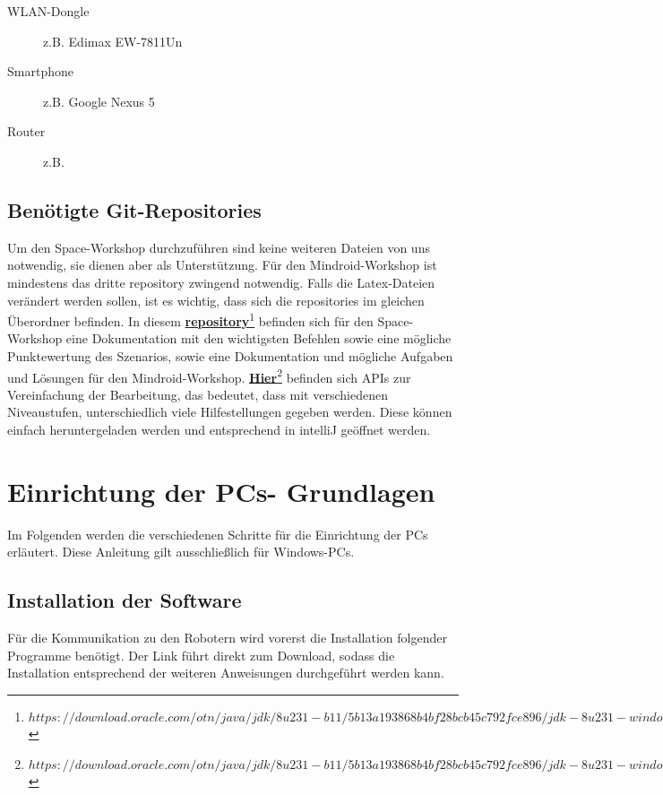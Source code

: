 \documentclass[
	ngerman,
	accentcolor=1c,%
	]{tudapub}
\begin{document}
\begin{description}
	\item[WLAN-Dongle] z.B. Edimax EW-7811Un
	\item[Smartphone] z.B. Google Nexus 5
	\item[Router] z.B. 
\end{description}

\subsection{Ben\"otigte Git-Repositories}
Um den Space-Workshop durchzuf\"uhren sind keine weiteren Dateien von uns notwendig, sie dienen aber als Unterst\"utzung. F\"ur den Mindroid-Workshop ist mindestens das dritte repository zwingend notwendig. Falls die Latex-Dateien ver\"andert werden sollen, ist es wichtig, dass sich die repositories im gleichen \"Uberordner befinden.\newline
In diesem
\href{https://download.oracle.com/otn/java/jdk/8u231-b11/5b13a193868b4bf28bcb45c792fce896/jdk-8u231-windows-x64.exe}{\textbf{repository}\footnote{$https://download.oracle.com/otn/java/jdk/8u231-b11/5b13a193868b4bf28bcb45c792fce896/jdk-8u231-windows-x64.exe$}}
befinden sich für den Space-Workshop eine Dokumentation mit den wichtigsten Befehlen sowie eine m\"ogliche Punktewertung des Szenarios, sowie eine Dokumentation und m\"ogliche Aufgaben und L\"osungen f\"ur den Mindroid-Workshop.
\href{https://download.oracle.com/otn/java/jdk/8u231-b11/5b13a193868b4bf28bcb45c792fce896/jdk-8u231-windows-x64.exe}{\textbf{Hier}\footnote{$https://download.oracle.com/otn/java/jdk/8u231-b11/5b13a193868b4bf28bcb45c792fce896/jdk-8u231-windows-x64.exe$}}
befinden sich APIs zur Vereinfachung der Bearbeitung, das bedeutet, dass mit verschiedenen Niveaustufen, unterschiedlich viele Hilfestellungen gegeben werden. Diese k\"onnen einfach heruntergeladen werden und entsprechend in intelliJ ge\"offnet werden.


\section{Einrichtung der PCs- Grundlagen}
Im Folgenden werden die verschiedenen Schritte für die Einrichtung der PCs erl\"autert. Diese Anleitung gilt ausschlie\ss{}lich f\"ur Windows-PCs.

\subsection{Installation der Software}
F\"ur die Kommunikation zu den Robotern wird vorerst die Installation folgender Programme ben\"otigt. Der Link f\"uhrt direkt zum Download, sodass die Installation entsprechend der weiteren Anweisungen durchgef\"uhrt werden kann.\newline
\end{document}
